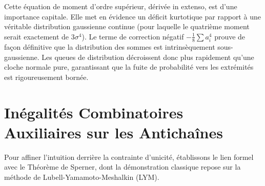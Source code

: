 \documentclass[12pt,a4paper]{article}
\begin{document}
Cette équation de moment d'ordre supérieur, dérivée in extenso, est d'une importance capitale. Elle met en évidence un déficit kurtotique par rapport à une véritable distribution gaussienne continue (pour laquelle le quatrième moment serait exactement de $3\sigma^4$). Le terme de correction négatif $-\frac{1}{8} \sum a_i^4$ prouve de façon définitive que la distribution des sommes est intrinsèquement sous-gaussienne. Les queues de distribution décroissent donc plus rapidement qu'une cloche normale pure, garantissant que la fuite de probabilité vers les extrémités est rigoureusement bornée.

\newpage
\section{Inégalités Combinatoires Auxiliaires sur les Antichaînes}

Pour affiner l'intuition derrière la contrainte d'unicité, établissons le lien formel avec le Théorème de Sperner, dont la démonstration classique repose sur la méthode de Lubell-Yamamoto-Meshalkin (LYM).
\end{document}
